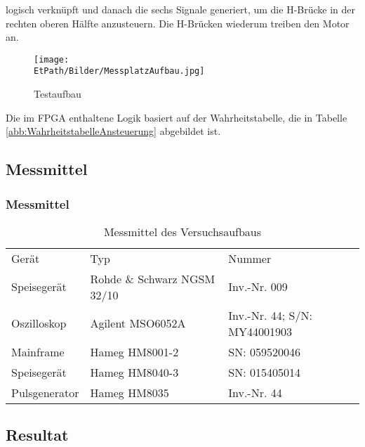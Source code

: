     logisch verknüpft und danach die sechs Signale generiert, um die H-Brücke 
    in der rechten oberen Hälfte anzusteuern.  Die H-Brücken wiederum treiben 
    den Motor an.
    \begin{figure}[h!]
       	\texttt{[image: \\EtPath/Bilder/MessplatzAufbau.jpg]}
       	\centering
       	\caption{Testaufbau} 
        \label{abb:MessplatzAufbau}
    \end{figure}
    Die im FPGA enthaltene Logik basiert auf der Wahrheitstabelle, die in 
    Tabelle \ref{abb:WahrheitstabelleAnsteuerung} abgebildet ist.

\ifSTANDALONE
\subsection{Messmittel}
\fi
\ifEMBED
\subsubsection{Messmittel}
\fi
    \begin{table}[h!]
        \centering
        \begin{tabular}{lll}
            \rowcolor{gray}
            Gerät &
                Typ &
                Nummer \\
            Speisegerät & 
                Rohde \& Schwarz NGSM 32/10 &
                Inv.-Nr. 009 \\
            Oszilloskop &
                Agilent MSO6052A &
                Inv.-Nr. 44; S/N: MY44001903 \\
            Mainframe &
                Hameg HM8001-2 &
                SN: 059520046 \\
            Speisegerät &
                Hameg HM8040-3 &
                SN: 015405014 \\
            Pulsgenerator &
                Hameg HM8035 &
                Inv.-Nr. 44 \\
        \end{tabular}
        \caption{Messmittel des Versuchsaufbaus}
    \end{table}

\ifSTANDALONE
\subsection{Resultat}
\label{chap:VersuchsResultat}
\fi
\ifEMBED
